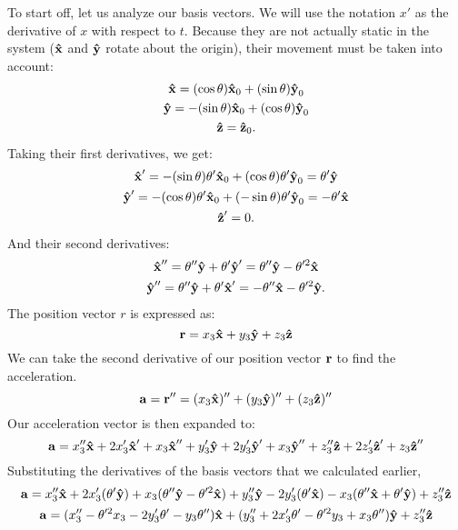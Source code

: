 To start off, let us analyze our basis vectors.
We will use the notation $x'$ as the derivative of $x$ with respect to $t$.
Because they are not actually static in the system ($\uvec{x}$ and $\uvec{y}$ rotate about the origin), their movement must be taken into account:
\begin{gather*}
	\uvec{x} = (\cos\theta)\uvec{x}_0 + (\sin\theta)\uvec{y}_0 \\
	\uvec{y} = -(\sin\theta)\uvec{x}_0 + (\cos\theta)\uvec{y}_0 \\
	\uvec{z} = \uvec{z}_0 \text{.}
\end{gather*}
Taking their first derivatives, we get:
\begin{gather*}
	\uvec{x}' = -(\sin\theta)\theta'\uvec{x}_0 + (\cos\theta)\theta'\uvec{y}_0 = \theta'\uvec{y} \\
	\uvec{y}' = -(\cos\theta)\theta'\uvec{x}_0 + (-\sin\theta)\theta'\uvec{y}_0 = -\theta'\uvec{x} \\
	\uvec{z}' = 0 \text{.}
\end{gather*}
And their second derivatives:
\begin{gather*}
	\uvec{x}'' = \theta''\uvec{y} + \theta'\uvec{y}' = \theta''\uvec{y} - \theta'^2\uvec{x} \\
	\uvec{y}'' = \theta''\uvec{y} + \theta'\uvec{x}' = -\theta''\uvec{x} - \theta'^2\uvec{y} \text{.}
\end{gather*}
The position vector $r$ is expressed as:
\begin{equation*}
	\bvec{r} = x_3\uvec{x} + y_3\uvec{y} + z_3\uvec{z}
\end{equation*}
We can take the second derivative of our position vector $\bm{\mathbf{r}}$ to find the acceleration.
\begin{equation*}
	\bvec{a} = \bvec{r}'' = (x_3\uvec{x})'' + (y_3\uvec{y})'' + (z_3\uvec{z})''
\end{equation*}
Our acceleration vector is then expanded to:
\begin{equation*}
	\bvec{a} = x_3''\uvec{x} + 2x_3'\uvec{x}' + x_3\uvec{x}'' + y_3'\uvec{y} + 2y_3'\uvec{y}' + x_3\uvec{y}'' + z_3''\uvec{z} + 2z_3'\uvec{z}' + z_3\uvec{z}''
\end{equation*}
Substituting the derivatives of the basis vectors that we calculated earlier,
\begin{gather*}
	\bvec{a} = x_3''\uvec{x} + 2x_3'(\theta'\uvec{y}) + x_3(\theta''\uvec{y} - \theta'^2\uvec{x}) + y_3''\uvec{y} - 2y_3'(\theta'\uvec{x}) - x_3(\theta''\uvec{x} + \theta'\uvec{y}) + z_3''\uvec{z} \\
	\bvec{a} = (x_3'' - \theta'^2x_3 - 2y_3'\theta' - y_3\theta'')\uvec{x} + (y_3'' + 2x_3'\theta' - \theta'^2y_3 + x_3\theta'')\uvec{y} + z_3''\uvec{z}
\end{gather*}
